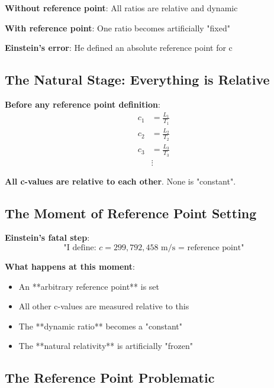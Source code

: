 \documentclass[12pt,a4paper]{article}
\begin{document}
{{{{{{{\begin{tcolorbox}[colback=red!5!white,colframe=red!75!black,title=The Reference Point Illusion]
									\textbf{Without reference point}: All ratios are relative and dynamic
									
									\textbf{With reference point}: One ratio becomes artificially "fixed"
									
									\textbf{Einstein's error}: He defined an absolute reference point for c
								\end{tcolorbox}
								
								\subsection{The Natural Stage: Everything is Relative}
								
								\textbf{Before any reference point definition}:
								\begin{align}
									c_1 &= \frac{L_1}{T_1} \\
									c_2 &= \frac{L_2}{T_2} \\
									c_3 &= \frac{L_3}{T_3} \\
									&\vdots
								\end{align}
								
								\textbf{All c-values are relative to each other}. None is "constant".
								
								\subsection{The Moment of Reference Point Setting}
								
								\textbf{Einstein's fatal step}:
								\begin{equation}
									\text{"I define: } c = 299,792,458 \text{ m/s = reference point"}
								\end{equation}
								
								\textbf{What happens at this moment}:
								\begin{itemize}
									\item An **arbitrary reference point** is set
									\item All other c-values are measured relative to this
									\item The **dynamic ratio** becomes a "constant"
									\item The **natural relativity** is artificially "frozen"
								\end{itemize}
								
								\subsection{The Reference Point Problematic}
								
}}}}}}}
\end{document}
